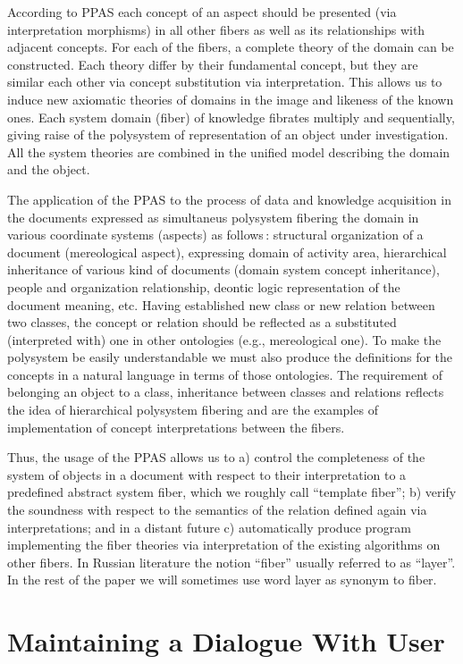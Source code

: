 \documentclass[conference]{IEEEtran}
\begin{document}
According to PPAS \cite{father} each concept of an aspect should be
presented (via interpretation morphisms) in all other fibers as well
as its relationships with adjacent concepts.  For each of the fibers,
a complete theory of the domain can be constructed.  Each theory
differ by their fundamental concept, but they are similar each other
via concept substitution via interpretation.  This allows us to induce
new axiomatic theories of domains in the image and likeness of the
known ones.  Each system domain (fiber) of knowledge fibrates multiply
and sequentially, giving raise of the polysystem of representation of
an object under investigation.  All the system theories are combined
in the unified model describing the domain and the object.

The application of the PPAS to the process of data and knowledge
acquisition in the documents expressed as simultaneus polysystem
fibering the domain in various coordinate systems (aspects) as
follows\,: structural organization of a document (mereological
aspect), expressing domain of activity area, hierarchical inheritance
of various kind of documents (domain system concept inheritance),
people and organization relationship, deontic logic representation of
the document meaning, etc.  Having established new class or new
relation between two classes, the concept or relation should be
reflected as a substituted (interpreted with) one in other ontologies
(e.g., mereological one).  To make the polysystem be easily
understandable we must also produce the definitions for the concepts
in a natural language in terms of those ontologies.  The requirement
of belonging an object to a class, inheritance between classes and
relations reflects the idea of hierarchical polysystem fibering and
are the examples of implementation of concept interpretations between
the fibers.

Thus, the usage of the PPAS allows us to a) control the completeness
of the system of objects in a document with respect to their
interpretation to a predefined abstract system fiber, which we roughly
call ``template fiber''; b) verify the soundness with respect to the
semantics of the relation defined again via interpretations; and in a
distant future c) automatically produce program implementing the fiber
theories via interpretation of the existing algorithms on other
fibers.  In Russian literature the notion ``fiber'' usually referred
to as ``layer''.  In the rest of the paper we will sometimes use word
layer as synonym to fiber.

\section{Maintaining a Dialogue With User}
\end{document}
